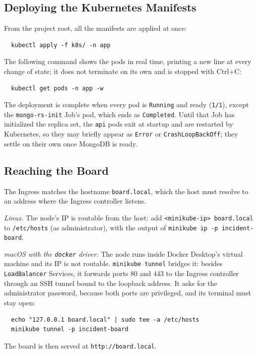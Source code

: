 \documentclass{scrartcl}
\begin{document}
\subsection{Deploying the Kubernetes Manifests}\label{deploying-manifests}

From the project root, all the manifests are applied at once:
%
\begin{verbatim}
  kubectl apply -f k8s/ -n app
\end{verbatim}
%
The following command shows the pods in real time, printing a new line at every change of state; it does not terminate on its own and is stopped with Ctrl+C:
%
\begin{verbatim}
  kubectl get pods -n app -w
\end{verbatim}
%
The deployment is complete when every pod is \texttt{Running} and ready (\texttt{1/1}), except the \texttt{mongo-rs-init} Job's pod, which ends as \texttt{Completed}. Until that Job has initialized the replica set, the \texttt{api} pods exit at startup and are restarted by Kubernetes, so they may briefly appear as \texttt{Error} or \texttt{CrashLoopBackOff}; they settle on their own once MongoDB is ready.

\subsection{Reaching the Board}\label{reaching-board}

The Ingress matches the hostname \texttt{board.local}, which the host must resolve to an address where the Ingress controller listens.

\emph{Linux.} The node's IP is routable from the host: add \texttt{<minikube-ip>  board.local} to \texttt{/etc/hosts} (as administrator), with the output of \texttt{minikube ip -p incident-board}.

\emph{macOS with the \texttt{docker} driver.} The node runs inside Docker Desktop's virtual machine and its IP is not routable. \texttt{minikube tunnel} bridges it: besides \texttt{LoadBalancer} Services, it forwards ports 80 and 443 to the Ingress controller through an SSH tunnel bound to the loopback address. It asks for the administrator password, because both ports are privileged, and its terminal must stay open:
%
\begin{verbatim}
  echo "127.0.0.1 board.local" | sudo tee -a /etc/hosts
  minikube tunnel -p incident-board
\end{verbatim}
%

The board is then served at \texttt{http://board.local}.
\end{document}
